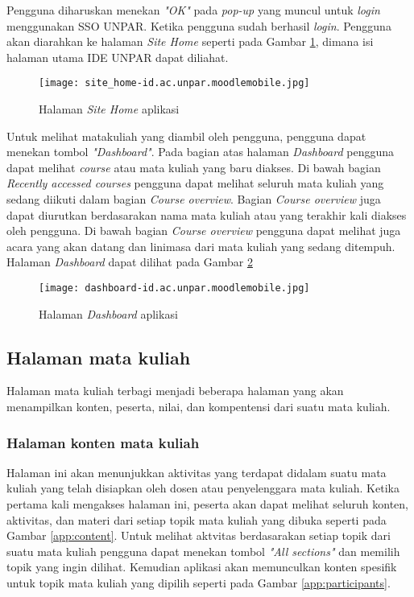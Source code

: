 Pengguna diharuskan menekan \textit{"OK"} pada \textit{pop-up} yang muncul untuk \textit{login} menggunakan SSO UNPAR. Ketika pengguna sudah berhasil \textit{login}. Pengguna akan diarahkan ke halaman \textit{Site Home} seperti pada Gambar \ref{app:site-home}, dimana isi halaman utama IDE UNPAR dapat diliahat. 

\begin{figure}[H] 
	\centering  
	\texttt{[image: site\_home-id.ac.unpar.moodlemobile.jpg]}  
	\caption[Halaman \textit{Site Home} aplikasi] {Halaman \textit{Site Home} aplikasi} 
	\label{app:site-home} 
\end{figure}  

Untuk melihat matakuliah yang diambil oleh pengguna, pengguna dapat menekan tombol \textit{"Dashboard"}. Pada bagian atas halaman \textit{Dashboard} pengguna dapat melihat \textit{course} atau mata kuliah yang baru diakses. Di bawah bagian \textit{Recently accessed courses} pengguna dapat melihat seluruh mata kuliah yang sedang diikuti dalam bagian \textit{Course overview}. Bagian \textit{Course overview} juga dapat diurutkan berdasarakan nama mata kuliah atau yang terakhir kali diakses oleh pengguna. Di bawah bagian \textit{Course overview} pengguna dapat melihat juga acara yang akan datang dan linimasa dari mata kuliah yang sedang ditempuh. Halaman \textit{Dashboard} dapat dilihat pada Gambar \ref{app:dashboard}

\begin{figure}[H] 
	\centering  
	\texttt{[image: dashboard-id.ac.unpar.moodlemobile.jpg]}  
	\caption[Halaman \textit{Dashboard} aplikasi] {Halaman \textit{Dashboard} aplikasi} 
	\label{app:dashboard} 
\end{figure}  

\subsection{Halaman mata kuliah}

Halaman mata kuliah terbagi menjadi beberapa halaman yang akan menampilkan konten, peserta, nilai, dan kompentensi dari suatu mata kuliah. 

\subsubsection{Halaman konten mata kuliah}

Halaman ini akan menunjukkan aktivitas yang terdapat didalam suatu mata kuliah yang telah disiapkan oleh dosen atau penyelenggara mata kuliah. Ketika pertama kali mengakses halaman ini, peserta akan dapat melihat seluruh konten, aktivitas, dan materi dari setiap topik mata kuliah yang dibuka seperti pada Gambar \ref{app:content}. Untuk melihat aktvitas berdasarakan setiap topik dari suatu mata kuliah pengguna dapat menekan tombol \textit{"All sections"} dan memilih topik yang ingin dilihat. Kemudian aplikasi akan memunculkan konten spesifik untuk topik mata kuliah yang dipilih seperti pada Gambar \ref{app:participants}.


